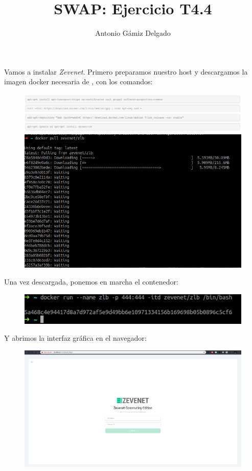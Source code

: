 \documentclass[12pt]{article}
\begin{document}
\title{SWAP: Ejercicio T4.4}
\author{
        Antonio Gámiz Delgado
}
\maketitle
\medskip

Vamos a instalar \textit{Zevenet}. Primero preparamos nuestro host y descargamos la imagen docker necesaria de \cite{a1}, con los comandos:

\begin{figure}[H]
  \center
  \includegraphics[scale=0.5,width=\textwidth]{img/2.png}
  \includegraphics[scale=0.5,width=\textwidth]{img/3.png}
\end{figure}

Una vez descargada, ponemos en marcha el contenedor:

\begin{figure}[H]
  \center
  \includegraphics[scale=0.5,width=\textwidth]{img/4.png}
\end{figure}

Y abrimos la interfaz gráfica en el navegador:

\begin{figure}[H]
  \center
  \includegraphics[scale=0.5,width=\textwidth]{img/5.png}
\end{figure}
\end{document}
